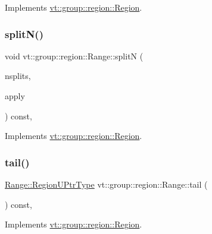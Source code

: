 Implements \hyperlink{structvt_1_1group_1_1region_1_1_region_a2cbbbff6358f0f63235d95501858f512}{vt\+::group\+::region\+::\+Region}.

\mbox{\label{structvt_1_1group_1_1region_1_1_range_a6fcfec2c3fabe024559c2f278a8d12e5}} 
\subsubsection{\texorpdfstring{split\+N()}{splitN()}}
{\footnotesize\ttfamily void vt\+::group\+::region\+::\+Range\+::splitN (\begin{DoxyParamCaption}\item[{int}]{nsplits,  }\item[{\hyperlink{structvt_1_1group_1_1region_1_1_region_a7c9e99b1157d2fe2f3e6fc36a1463a96}{Apply\+Fn\+Type}}]{apply }\end{DoxyParamCaption}) const\hspace{0.3cm}{\ttfamily [override]}, {\ttfamily [virtual]}}



Implements \hyperlink{structvt_1_1group_1_1region_1_1_region_ae8660d4218b57e91664dedfa807cd936}{vt\+::group\+::region\+::\+Region}.

\mbox{\label{structvt_1_1group_1_1region_1_1_range_a409f171c688707fa71e4aea1099ce691}} 
\subsubsection{\texorpdfstring{tail()}{tail()}}
{\footnotesize\ttfamily \hyperlink{structvt_1_1group_1_1region_1_1_region_ae5f42cf159116a3cf8bd65423eb01037}{Range\+::\+Region\+U\+Ptr\+Type} vt\+::group\+::region\+::\+Range\+::tail (\begin{DoxyParamCaption}{ }\end{DoxyParamCaption}) const\hspace{0.3cm}{\ttfamily [override]}, {\ttfamily [virtual]}}



Implements \hyperlink{structvt_1_1group_1_1region_1_1_region_a7d5bc5711c1b7954e27defa4dc94af40}{vt\+::group\+::region\+::\+Region}.



